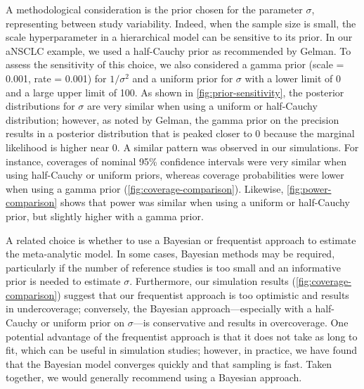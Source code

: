 \documentclass[11pt,final,fleqn]{article}\usepackage[]{graphicx}\usepackage[]{color}
\begin{document}
A methodological consideration is the prior chosen for the parameter $\sigma$, representing between study variability. Indeed, when the sample size is small, the scale hyperparameter in a hierarchical model can be sensitive to its prior. In our aNSCLC example, we used a half-Cauchy prior as recommended by Gelman.\cite{gelman2006prior} To assess the sensitivity of this choice, we also considered a gamma prior (scale = 0.001, rate = 0.001) for $1/\sigma^2$ and a uniform prior for $\sigma$ with a lower limit of 0 and a large upper limit of 100. As shown in \autoref{fig:prior-sensitivity}, the posterior distributions for $\sigma$ are very similar when using a uniform or half-Cauchy distribution; however, as noted by Gelman, the gamma prior on the precision results in a posterior distribution that is peaked closer to 0 because the marginal likelihood is higher near 0. A similar pattern was observed in our simulations. For instance, coverages of nominal 95\% confidence intervals were very similar when using half-Cauchy or uniform priors, whereas coverage probabilities were lower when using a gamma prior (\autoref{fig:coverage-comparison}). Likewise, \autoref{fig:power-comparison} shows that power was similar when using a uniform or half-Cauchy prior, but slightly higher with a gamma prior.

A related choice is whether to use a Bayesian or frequentist approach to estimate the meta-analytic model. In some cases, Bayesian methods may be required, particularly if the number of reference studies is too small and an informative prior is needed to estimate $\sigma$. Furthermore, our simulation results (\autoref{fig:coverage-comparison}) suggest that our frequentist approach is too optimistic and results in undercoverage; conversely, the Bayesian approach---especially with a half-Cauchy or uniform prior on $\sigma$---is conservative and results in overcoverage. One potential advantage of the frequentist approach is that it does not take as long to fit, which can be useful in simulation studies; however, in practice, we have found that the Bayesian model converges quickly and that sampling is fast. Taken together, we would generally recommend using a Bayesian approach.
\end{document}
